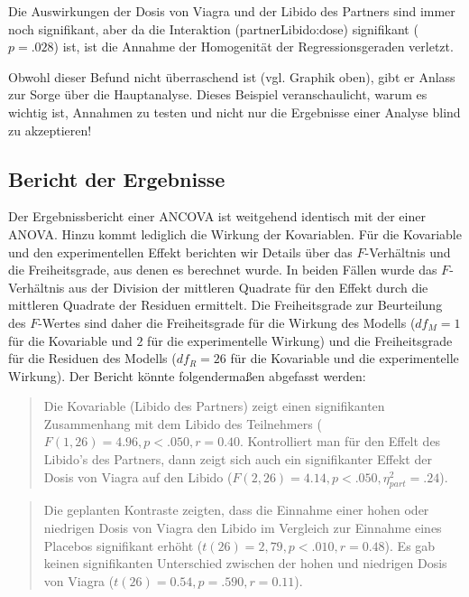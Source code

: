 \documentclass[]{article}
\begin{document}
Die Auswirkungen der Dosis von Viagra und der Libido des Partners sind immer noch signifikant, aber da die Interaktion (partnerLibido:dose) signifikant (\(p = .028\)) ist, ist die Annahme der Homogenität der Regressionsgeraden verletzt.

Obwohl dieser Befund nicht überraschend ist (vgl. Graphik oben), gibt er Anlass zur Sorge über die Hauptanalyse. Dieses Beispiel veranschaulicht, warum es wichtig ist, Annahmen zu testen und nicht nur die Ergebnisse einer Analyse blind zu akzeptieren!

\hypertarget{bericht-der-ergebnisse}{%
\subsection*{Bericht der Ergebnisse}\label{bericht-der-ergebnisse}}

Der Ergebnissbericht einer ANCOVA ist weitgehend identisch mit der einer ANOVA. Hinzu kommt lediglich die Wirkung der Kovariablen. Für die Kovariable und den experimentellen Effekt berichten wir Details über das \(F\)-Verhältnis und die Freiheitsgrade, aus denen es berechnet wurde. In beiden Fällen wurde das \(F\)-Verhältnis aus der Division der mittleren Quadrate für den Effekt durch die mittleren Quadrate der Residuen ermittelt. Die Freiheitsgrade zur Beurteilung des \(F\)-Wertes sind daher die Freiheitsgrade für die Wirkung des Modells (\(df_M = 1\) für die Kovariable und \(2\) für die experimentelle Wirkung) und die Freiheitsgrade für die Residuen des Modells (\(df_R = 26\) für die Kovariable und die experimentelle Wirkung). Der Bericht könnte folgendermaßen abgefasst werden:

\begin{quote}
Die Kovariable (Libido des Partners) zeigt einen signifikanten Zusammenhang mit dem Libido des Teilnehmers (\(F(1, 26) = 4.96, p < .050, r = 0.40\). Kontrolliert man für den Effelt des Libido's des Partners, dann zeigt sich auch ein signifikanter Effekt der Dosis von Viagra auf den Libido (\(F(2, 26) = 4.14, p < .050, \eta^2_{part} = .24\)).
\end{quote}

\begin{quote}
Die geplanten Kontraste zeigten, dass die Einnahme einer hohen oder niedrigen Dosis von Viagra den Libido im Vergleich zur Einnahme eines Placebos signifikant erhöht (\(t(26) = 2,79, p < .010, r = 0.48\)). Es gab keinen signifikanten Unterschied zwischen der hohen und niedrigen Dosis von Viagra (\(t(26) = 0.54, p = .590, r = 0.11\)).
\end{quote}
\end{document}
